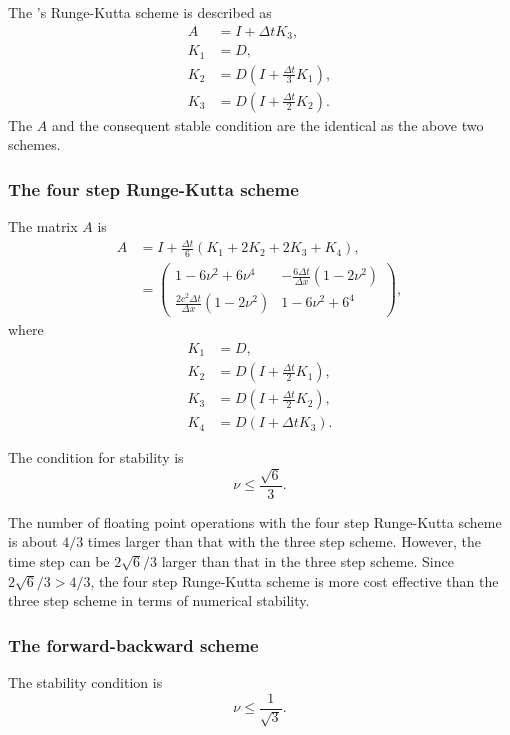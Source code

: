 The \citet{Wicker_2002}'s Runge-Kutta scheme is described as
\begin{align}
  A &= I + \Delta t K_3, \\
  K_1 &= D, \\
  K_2 &= D \left(I + \frac{\Delta t}{3}K_1\right), \\
  K_3 &= D \left(I + \frac{\Delta t}{2}K_2\right).
\end{align}
The $A$ and the consequent stable condition are the identical as the above two schemes.


\subsubsection{The four step Runge-Kutta scheme}
The matrix $A$ is
\begin{align}
  A &= I + \frac{\Delta t}{6}(K_1 + 2K_2 + 2K_3 + K_4), \\
  &= \begin{pmatrix}
    1-6\nu^2+6\nu^4 & -\frac{6\Delta t}{\Delta x}(1-2\nu^2) \\
    \frac{2c^2\Delta t}{\Delta x}(1-2\nu^2) & 1-6\nu^2+6^4
  \end{pmatrix},
\end{align}
where
\begin{align}
  K_1 &= D, \\
  K_2 &= D \left(I + \frac{\Delta t}{2}K_1\right), \\
  K_3 &= D \left(I + \frac{\Delta t}{2}K_2\right), \\
  K_4 &= D (I + \Delta t K_3).
\end{align}

The condition for stability is
\begin{equation}
  \nu \le \frac{\sqrt{6}}{3}.
\end{equation}

The number of floating point operations with the four step Runge-Kutta scheme is about $4/3$ times larger than that with the three step scheme.
However, the time step can be $2\sqrt{6}/3$ larger than that in the three step scheme.
Since $2\sqrt{6}/3 > 4/3$, the four step Runge-Kutta scheme is more cost effective than the three step scheme in terms of numerical stability.


\subsubsection{The forward-backward scheme}
The stability condition is
\begin{equation}
  \nu \le \frac{1}{\sqrt{3}}.
\end{equation}

